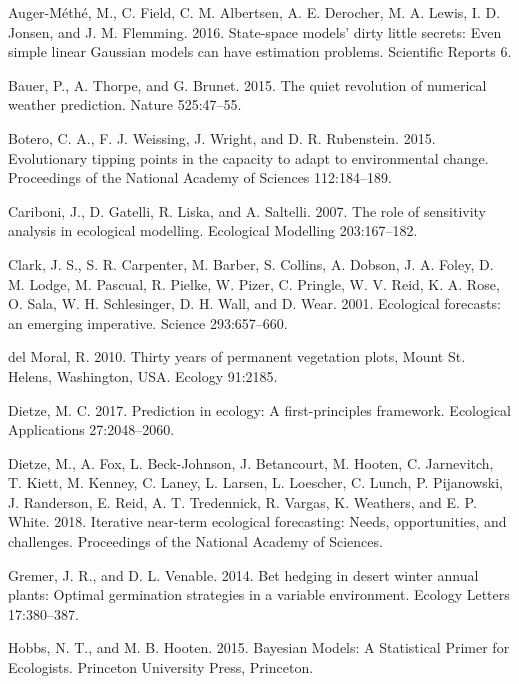 \documentclass[12pt,]{article}
\begin{document}
\hypertarget{refs}{}
\leavevmode\hypertarget{ref-Auger-Methe2016}{}%
Auger-Méthé, M., C. Field, C. M. Albertsen, A. E. Derocher, M. A. Lewis,
I. D. Jonsen, and J. M. Flemming. 2016. State-space models' dirty little
secrets: Even simple linear Gaussian models can have estimation
problems. Scientific Reports 6.

\leavevmode\hypertarget{ref-Bauer2015}{}%
Bauer, P., A. Thorpe, and G. Brunet. 2015. The quiet revolution of
numerical weather prediction. Nature 525:47--55.

\leavevmode\hypertarget{ref-Botero2015}{}%
Botero, C. A., F. J. Weissing, J. Wright, and D. R. Rubenstein. 2015.
Evolutionary tipping points in the capacity to adapt to environmental
change. Proceedings of the National Academy of Sciences 112:184--189.

\leavevmode\hypertarget{ref-Cariboni2007}{}%
Cariboni, J., D. Gatelli, R. Liska, and A. Saltelli. 2007. The role of
sensitivity analysis in ecological modelling. Ecological Modelling
203:167--182.

\leavevmode\hypertarget{ref-Clark2001}{}%
Clark, J. S., S. R. Carpenter, M. Barber, S. Collins, A. Dobson, J. A.
Foley, D. M. Lodge, M. Pascual, R. Pielke, W. Pizer, C. Pringle, W. V.
Reid, K. A. Rose, O. Sala, W. H. Schlesinger, D. H. Wall, and D. Wear.
2001. Ecological forecasts: an emerging imperative. Science
293:657--660.

\leavevmode\hypertarget{ref-DelMoral2010}{}%
del Moral, R. 2010. Thirty years of permanent vegetation plots, Mount
St. Helens, Washington, USA. Ecology 91:2185.

\leavevmode\hypertarget{ref-Dietze2017a}{}%
Dietze, M. C. 2017. Prediction in ecology: A first-principles framework.
Ecological Applications 27:2048--2060.

\leavevmode\hypertarget{ref-Dietze2018}{}%
Dietze, M., A. Fox, L. Beck-Johnson, J. Betancourt, M. Hooten, C.
Jarnevitch, T. Kiett, M. Kenney, C. Laney, L. Larsen, L. Loescher, C.
Lunch, P. Pijanowski, J. Randerson, E. Reid, A. T. Tredennick, R.
Vargas, K. Weathers, and E. P. White. 2018. Iterative near-term
ecological forecasting: Needs, opportunities, and challenges.
Proceedings of the National Academy of Sciences.

\leavevmode\hypertarget{ref-Gremer2014}{}%
Gremer, J. R., and D. L. Venable. 2014. Bet hedging in desert winter
annual plants: Optimal germination strategies in a variable environment.
Ecology Letters 17:380--387.

\leavevmode\hypertarget{ref-Hobbs2015}{}%
Hobbs, N. T., and M. B. Hooten. 2015. Bayesian Models: A Statistical
Primer for Ecologists. Princeton University Press, Princeton.
\end{document}
